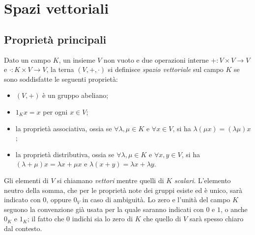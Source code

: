 \chapter{Spazi vettoriali} \label{ch:spazi-vettoriali}
\section{Proprietà principali} \label{sec:proprieta-spazi-vettoriali}
\begin{definizione} \label{d:spazio-vettoriale}
	Dato un campo $K$, un insieme $V$ non vuoto e due operazioni interne $+\colon V\times V\to V$ e $\cdot\colon K\times V\to V$, la terna $(V,+,\cdot)$ si definisce \emph{spazio vettoriale} sul campo $K$ se sono soddisfatte le seguenti proprietà:
	\begin{itemize}
		\item $(V,+)$ è un gruppo abeliano;
		\item $1_K x=x$ per ogni $x\in V$;
		\item la proprietà associativa, ossia se $\forall\lambda,\mu\in K$ e $\forall x\in V$, si ha $\lambda(\mu x)=(\lambda\mu) x$;
		\item la proprietà distributiva, ossia se $\forall\lambda,\mu\in K$ e $\forall x,y\in V$, si ha $(\lambda+\mu)x=\lambda  x+\mu x$ e $\lambda(x+y)=\lambda  x+\lambda  y$.
	\end{itemize}
\end{definizione}
Gli elementi di $V$ si chiamano \emph{vettori} mentre quelli di $K$ \emph{scalari}.
L'elemento neutro della somma, che per le proprietà note dei gruppi esiste ed è unico, sarà indicato con $0$, oppure $0_V$ in caso di ambiguità.
Lo zero e l'unità del campo $K$ seguono la convenzione già usata per la quale saranno indicati con $0$ e $1$, o anche $0_K$ e $1_K$; il fatto che $0$ indichi sia lo zero di $K$ che quello di $V$ sarà spesso chiaro dal contesto.
